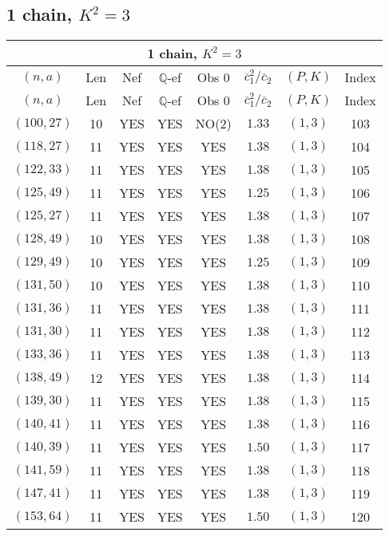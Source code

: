 \subsection{1 chain, $K^2 = 3$}
\begin{longtable}{|c|c|c|c|c|c|c|c|}
\hline
\multicolumn{8}{|c|}{1 chain, $K^2 = 3$}\\
\hline
$(n,a)$ & Len & Nef & $\mathbb Q$-ef & Obs 0 & $\overline c_1^2 / \overline c_2$ & $(P,K)$ & Index\\
\hline
\endfirsthead

\hline
$(n,a)$ & Len & Nef & $\mathbb Q$-ef & Obs 0 & $\overline c_1^2 / \overline c_2$ & $(P,K)$ & Index\\
\hline
\endhead
\hline
\endfoot

$(100,27)$ & 10 & YES & YES & NO(2) & $1.33$ & $(1,3)$ & 103\\
$(118,27)$ & 11 & YES & YES & YES & $1.38$ & $(1,3)$ & 104\\
$(122,33)$ & 11 & YES & YES & YES & $1.38$ & $(1,3)$ & 105\\
$(125,49)$ & 11 & YES & YES & YES & $1.25$ & $(1,3)$ & 106\\
$(125,27)$ & 11 & YES & YES & YES & $1.38$ & $(1,3)$ & 107\\
$(128,49)$ & 10 & YES & YES & YES & $1.38$ & $(1,3)$ & 108\\
$(129,49)$ & 10 & YES & YES & YES & $1.25$ & $(1,3)$ & 109\\
$(131,50)$ & 10 & YES & YES & YES & $1.38$ & $(1,3)$ & 110\\
$(131,36)$ & 11 & YES & YES & YES & $1.38$ & $(1,3)$ & 111\\
$(131,30)$ & 11 & YES & YES & YES & $1.38$ & $(1,3)$ & 112\\
$(133,36)$ & 11 & YES & YES & YES & $1.38$ & $(1,3)$ & 113\\
$(138,49)$ & 12 & YES & YES & YES & $1.38$ & $(1,3)$ & 114\\
$(139,30)$ & 11 & YES & YES & YES & $1.38$ & $(1,3)$ & 115\\
$(140,41)$ & 11 & YES & YES & YES & $1.38$ & $(1,3)$ & 116\\
$(140,39)$ & 11 & YES & YES & YES & $1.50$ & $(1,3)$ & 117\\
$(141,59)$ & 11 & YES & YES & YES & $1.38$ & $(1,3)$ & 118\\
$(147,41)$ & 11 & YES & YES & YES & $1.38$ & $(1,3)$ & 119\\
$(153,64)$ & 11 & YES & YES & YES & $1.50$ & $(1,3)$ & 120\\

\end{longtable}
